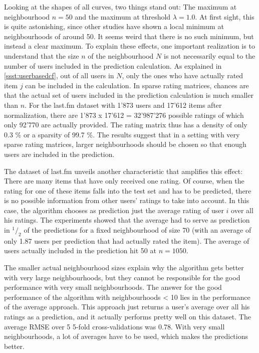 Looking at the shapes of all curves, two things stand out: The maximum at neighbourhood $n=50$ and the maximum at threshold $\lambda = 1.0$. At first sight, this is quite astonishing, since other studies have shown a local minimum at neighbourhoods of around 50. It seems weird that there is no such minimum, but instead a clear maximum. To explain these effects, one important realization is to understand that the size $n$ of the neighbourhood $N$ is not necessarily equal to the number of users included in the prediction calculation. As explained in \ref{ssst:userbasedcf}, out of all users in $N$, only the ones who have actually rated item $j$ can be included in the calculation. In sparse rating matrices, chances are that the actual set of users included in the prediction calculation is much smaller than $n$. For the last.fm dataset with 1'873 users and 17'612 items after normalization, there are 1'873 x 17'612 = 32'987'276 possible ratings of which only 92'770 are actually provided. The rating matrix thus has a density of only 0.3 \% or a sparsity of 99.7 \%. The results suggest that in a setting with very sparse rating matrices, larger neighbourhoods should be chosen so that enough users are included in the prediction.

The dataset of last.fm unveils another characteristic that amplifies this effect: There are many items that have only received one rating. Of course, when the rating for one of these items falls into the test set and has to be predicted, there is no possible information from other users' ratings to take into account. In this case, the algorithm chooses as prediction just the average rating of user $i$ over all his ratings. The experiments showed that the average had to serve as prediction in ${}^1/_2$ of the predictions for a fixed neighbourhood of size 70 (with an average of only 1.87 users per prediction that had actually rated the item). The average of users actually included in the prediction hit 50 at $n = 1050$.

The smaller actual neighbourhood sizes explain why the algorithm gets better with very large neighbourhoods, but they cannot be responsible for the good performance with very small neighbourhoods. The answer for the good performance of the algorithm with neighbourhoods < 10 lies in the performance of the average approach. This approach just returns a user's average over all his ratings as a prediction, and it actually performs pretty well on this dataset. The average RMSE over 5 5-fold cross-validations was 0.78. With very small neighbourhoods, a lot of averages have to be used, which makes the predictions better.

